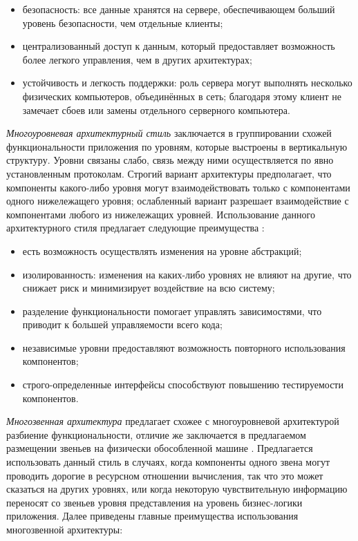 \begin{itemize}
	\item безопасность: все данные хранятся на сервере, обеспечивающем больший уровень безопасности, чем отдельные клиенты;
	\item централизованный доступ к данным, который предоставляет возможность более легкого управления, чем в других архитектурах;
	\item устойчивость и легкость поддержки: роль сервера могут выполнять несколько физических компьютеров, объединённых в сеть; благодаря этому клиент не замечает сбоев или замены отдельного серверного компьютера.
\end{itemize}

\emph{Многоуровневая архитектурный стиль} заключается в группировании схожей функциональности приложения по уровням, которые выстроены в вертикальную структуру. Уровни связаны слабо, связь между ними осуществляется по явно установленным протоколам. Строгий вариант архитектуры предполагает, что компоненты какого-либо уровня могут взаимодействовать только с компонентами одного нижележащего уровня; ослабленный вариант разрешает взаимодействие с компонентами любого из нижележащих уровней. Использование данного архитектурного стиля предлагает следующие преимущества \cite{application_architecture_guide}:

\begin{itemize}
	\item есть возможность осуществлять изменения на уровне абстракций;
	\item изолированность: изменения на каких-либо уровнях не влияют на другие, что снижает риск и минимизирует воздействие на всю систему;
	\item разделение функциональности помогает управлять зависимостями, что приводит к большей управляемости всего кода;
	\item независимые уровни предоставляют возможность повторного использования компонентов;
	\item строго-определенные интерфейсы способствуют повышению тестируемости компонентов.
\end{itemize}

\emph{Многозвенная архитектура} предлагает схожее с многоуровневой архитектурой разбиение функциональности, отличие же заключается в предлагаемом размещении звеньев на физически обособленной машине \cite{architecture_volosevich}. Предлагается использовать данный стиль в случаях, когда компоненты одного звена могут проводить дорогие в ресурсном отношении вычисления, так что это может сказаться на других уровнях, или когда некоторую чувствительную информацию переносят со звеньев уровня представления на уровень бизнес-логики приложения. Далее приведены главные преимущества использования многозвенной архитектуры:

